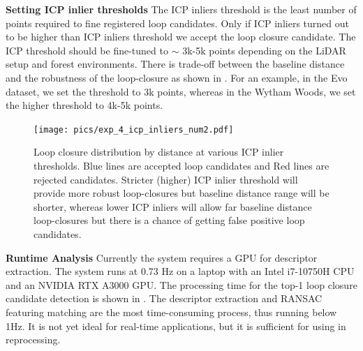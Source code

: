 \newline
\textbf{Setting ICP inlier thresholds} \hspace{0.5em} The ICP inliers threshold is the least number of points required to fine registered loop candidates. Only if ICP inliers turned out to be higher than ICP inliers threshold we accept the loop closure candidate. 
The ICP threshold should be fine-tuned to $\sim$ 3k-5k points depending on the LiDAR setup and forest environments. There is trade-off between the baseline distance and the robustness of the loop-closure as shown in . For an example, in the Evo dataset, we set the threshold to 3k points, whereas in the Wytham Woods, we set the higher threshold to 4k-5k points. \\
 \begin{figure}[t]
  \centering
  \texttt{[image: pics/exp\_4\_icp\_inliers\_num2.pdf]}
  \caption{Loop closure distribution by distance at various ICP inlier thresholds. Blue lines are accepted loop candidates and Red lines are rejected candidates. Stricter (higher) ICP inlier threshold will provide more robust loop-closures but baseline distance range will be shorter, whereas lower ICP inliers will allow far baseline distance loop-closures but there is a chance of getting false positive loop candidates.}
  \label{fig:icp_inliers_num}
\end{figure}
\newline
{\textbf{Runtime Analysis}}\hspace{0.5em} Currently the system requires a GPU for descriptor extraction. The system runs at 0.73 Hz on a laptop with an Intel i7-10750H CPU and an NVIDIA RTX A3000 GPU. The processing time for the top-1 loop closure candidate detection is shown in . The descriptor extraction and RANSAC featuring matching are the most time-consuming process, thus running below 1Hz. It is not yet ideal for real-time applications, but it is sufficient for using in reprocessing. 
